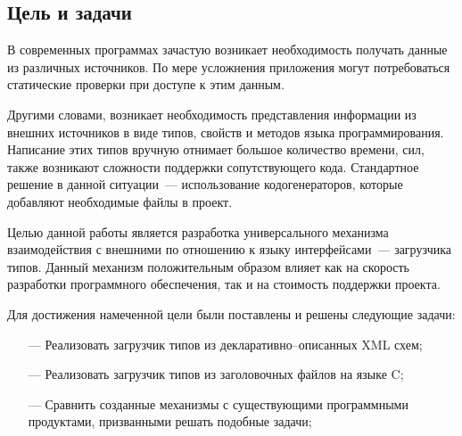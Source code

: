 \subsection{Цель и задачи}

В современных программах зачастую возникает необходимость получать данные из различных источников.
По мере усложнения приложения могут потребоваться статические проверки при доступе к этим данным.

Другими словами, возникает необходимость представления информации из внешних источников в виде типов, свойств и методов языка программирования.
Написание этих типов вручную отнимает большое количество времени, сил, также возникают сложности поддержки сопутствующего кода.
Стандартное решение в данной ситуации~--- использование кодогенераторов, которые добавляют необходимые файлы в проект.

Целью данной работы является разработка универсального механизма взаимодействия с внешними по отношению к языку интерфейсами~--- загрузчика типов. Данный механизм положительным образом влияет как на скорость разработки программного обеспечения, так и на стоимость поддержки проекта.

Для достижения намеченной цели были поставлены и решены следующие задачи:
\begin{itemize}
\item[---] Реализовать загрузчик типов из декларативно--описанных XML схем;
\item[---] Реализовать загрузчик типов из заголовочных файлов на языке C;
\item[---] Сравнить созданные механизмы с существующими программными продуктами, призванными решать подобные задачи;
\end{itemize}